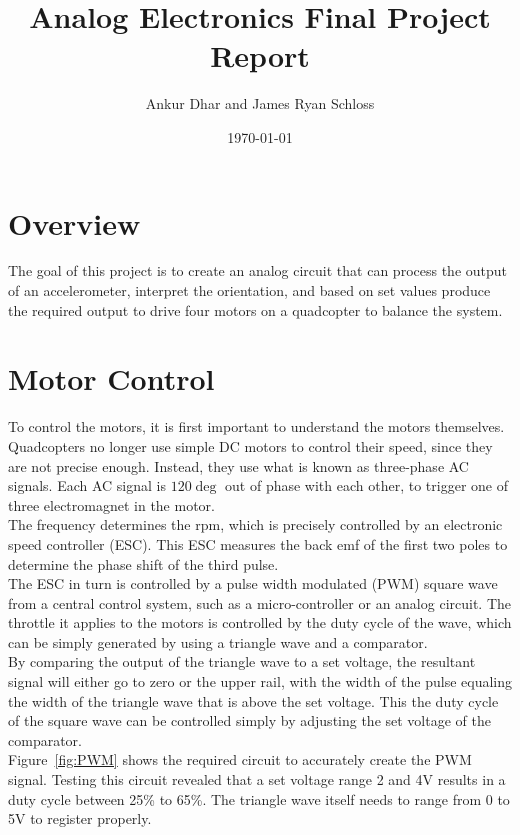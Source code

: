 \documentclass[11pt]{article} %
\title{Analog Electronics Final Project Report}
\author{Ankur Dhar and James Ryan Schloss}
\date{\today} %
\begin{document}
\maketitle
\section{Overview}
The goal of this project is to create an analog circuit that can process the output of an accelerometer, interpret the orientation, and based on set values produce the required output to drive four motors on a quadcopter to balance the system.



\section{Motor Control}
To control the motors, it is first important to understand the motors themselves. Quadcopters no longer use simple DC motors to control their speed, since they are not precise enough. Instead, they use what is known as three-phase AC signals. Each AC signal is $120\deg$ out of phase with each other, to trigger one of three electromagnet in the motor.\\
The frequency determines the rpm, which is precisely controlled by an electronic speed controller (ESC). This ESC measures the back emf of the first two poles to determine the phase shift of the third pulse.\\
The ESC in turn is controlled by a pulse width modulated (PWM) square wave from a central control system, such as a micro-controller or an analog circuit. The throttle it applies to the motors is controlled by the duty cycle of the wave, which can be simply generated by using a triangle wave and a comparator.\\
By comparing the output of the triangle wave to a set voltage, the resultant signal will either go to zero or the upper rail, with the width of the pulse equaling the width of the triangle wave that is above the set voltage. This the duty cycle of the square wave can be controlled simply by adjusting the set voltage of the comparator.\\
Figure~\ref{fig:PWM} shows the required circuit to accurately create the PWM signal. Testing this circuit revealed that a set voltage range 2 and 4V results in a duty cycle between 25\% to 65\%. The triangle wave itself needs to range from 0 to 5V to register properly.
\end{document}
